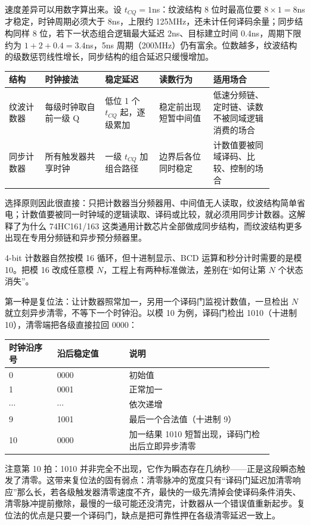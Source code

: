 速度差异可以用数字算出来。设 $t_{CQ}=1$ns：纹波结构 8 位时最高位要 $8\times1=8$ns 才稳定，时钟周期必须大于 8ns，上限约 125MHz，还未计任何译码余量；同步结构同样 8 位，若下一状态组合逻辑最大延迟 2ns、目标建立时间 0.4ns，周期下限约为 $1+2+0.4=3.4$ns，5ns 周期（200MHz）仍有富余。位数越多，纹波结构的级数惩罚线性增长，同步结构的组合延迟只缓慢增加。

\begin{longtable}{L{0.12\linewidth}L{0.20\linewidth}L{0.18\linewidth}L{0.18\linewidth}L{0.20\linewidth}}
\toprule
结构 & 时钟接法 & 稳定延迟 & 读数行为 & 适用场合 \\
\midrule
纹波计数器 & 每级时钟取自前一级 Q & 低位 1 个 $t_{CQ}$ 起，逐级累加 & 稳定前出现短暂中间值 & 低速分频链、定时链、读数不被同域逻辑消费的场合 \\
同步计数器 & 所有触发器共享时钟 & 一级 $t_{CQ}$ 加组合路径 & 边界后各位同时稳定 & 计数值要被同域译码、比较、控制的场合 \\
\bottomrule
\end{longtable}

选择原则因此很直接：只把计数器当分频器用、中间值无人读取，纹波结构简单省电；计数值要被同一时钟域的逻辑读取、译码或比较，就必须用同步计数器。这解释了为什么 74HC161/163 这类通用计数芯片全部做成同步结构，而纹波结构更多出现在专用分频链和异步预分频器里。


4-bit 计数器自然按模 16 循环，但十进制显示、BCD 运算和秒分计时需要的是模 10。把模 16 改成任意模 $N$，工程上有两种标准做法，差别在“如何让第 $N$ 个状态消失”。

第一种是复位法：让计数器照常加一，另用一个译码门监视计数值，一旦检出 $N$ 就立刻异步清零，不等下一个时钟沿。以模 10 为例，译码门检出 1010（十进制 10），清零端把各级直接拉回 0000：

\begin{longtable}{L{0.16\linewidth}L{0.24\linewidth}L{0.48\linewidth}}
\toprule
时钟沿序号 & 沿后稳定值 & 说明 \\
 & 0000 & 初始值 \\
1 & 0001 & 正常加一 \\
$\cdots$ & $\cdots$ & 依次递增 \\
9 & 1001 & 最后一个合法值（十进制 9） \\
10 & 0000 & 加一结果 1010 短暂出现，译码门检出后立即异步清零 \\
\bottomrule
\end{longtable}

注意第 10 拍：1010 并非完全不出现，它作为瞬态存在几纳秒——正是这段瞬态触发了清零。这带来复位法的固有弱点：清零脉冲的宽度只有“译码门延迟加清零响应”那么长，若各级触发器清零速度不齐，最快的一级先清掉会使译码条件消失、清零脉冲提前撤除，最慢的一级可能还没清完，计数器从一个错误值重新起步。复位法的优点是只要一个译码门，缺点是把可靠性押在各级清零延迟一致上。

